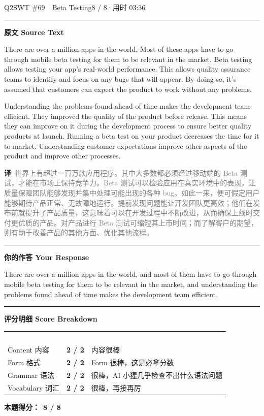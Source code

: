 \documentclass[11pt]{article}
\newcommand{\sfull}[1]{\textcolor{cFix}{\bfseries #1}}     %
\newcommand{\ptesub}[1]{%
  \par\needspace{2\baselineskip}\smallskip
  {\color{cAccent}\rule[-0.2ex]{3pt}{1.05em}}\hspace{6pt}%
  {\bfseries\color{cHead}#1}\par\nopagebreak\smallskip}
\newcommand{\scorehead}{%
  \rowcolors{2}{cGrayBox}{white}
  \arrayrulecolor{cRule}}
\newcommand{\zh}[1]{{\footnotesize\textcolor{cNote}{\textbf{译}}\ \textcolor{gray}{#1}}}
\begin{document}
\begin{qblock}{Q2\quad SWT \#69\ \ Beta Testing}{8 / 8\quad·\quad 用时 03:36}

\ptesub{原文 Source Text}
\begin{promptbox}
There are over a million apps in the world. Most of these apps have to go through mobile beta testing for them to be relevant in the market. Beta testing allows testing your app's real-world performance. This allows quality assurance teams to identify and focus on any bugs that will appear. By doing so, it's assumed that customers can expect the product to work without any problems.

Understanding the problems found ahead of time makes the development team efficient. They improved the quality of the product before release. This means they can improve on it during the development process to ensure better quality products at launch. Running a beta test on your product decreases the time for it to market. Understanding customer expectations improve other aspects of the product and improve other processes.
\end{promptbox}
\zh{世界上有超过一百万款应用程序。其中大多数都必须经过移动端的 Beta 测试，才能在市场上保持竞争力。Beta 测试可以检验应用在真实环境中的表现，让质量保障团队能够发现并集中处理可能出现的各种 bug。如此一来，便可假定用户能够期待产品正常、无故障地运行。提前发现问题能让开发团队更高效；他们在发布前就提升了产品质量，这意味着可以在开发过程中不断改进，从而确保上线时交付更优质的产品。对产品进行 Beta 测试可缩短其上市时间；而了解客户的期望，则有助于改善产品的其他方面、优化其他流程。}

\ptesub{你的作答 Your Response}
\begin{youbox}
There are over a million apps in the world, and most of them have to go through mobile beta testing for them to be relevant in the market, and understanding the problems found ahead of time makes the development team efficient.
\end{youbox}

\ptesub{评分明细 Score Breakdown}
{\small\scorehead
\begin{tabularx}{\linewidth}{l c Y}
\textcolor{white}{\bfseries 维度} & \textcolor{white}{\bfseries 得分} & \textcolor{white}{\bfseries AI 建议}\\
Content 内容        & \sfull{2 / 2} & 内容很棒\\
Form 格式          & \sfull{2 / 2} & Form 很棒，这是必拿分数\\
Grammar 语法       & \sfull{2 / 2} & 很棒，AI 小猩几乎检查不出什么语法问题\\
Vocabulary 词汇    & \sfull{2 / 2} & 很棒，再接再厉\\
\end{tabularx}}
\smallskip
\textbf{本题得分：}\ {\color{cAccent}\bfseries 8 / 8}

\end{qblock}
\end{document}
